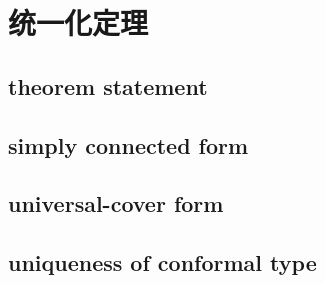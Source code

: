 \section{统一化定理}
\label{b3:sec:1202}


\subsection{theorem statement}
\label{b3:subsec:120201}

\subsection{simply connected form}
\label{b3:subsec:120202}

\subsection{universal-cover form}
\label{b3:subsec:120203}

\subsection{uniqueness of conformal type}
\label{b3:subsec:120204}


